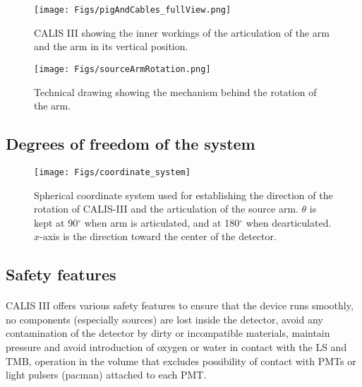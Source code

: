 \begin{figure}[htbp]
 \centering
  \texttt{[image: Figs/pigAndCables\_fullView.png]}
  \caption{CALIS III showing the inner workings of the articulation of the arm and the arm in its vertical position. }
  \label{fig:pigAndCables_fullView}
\end{figure}

\begin{figure}[htbp]
 \centering
  \texttt{[image: Figs/sourceArmRotation.png]}
  \caption{Technical drawing showing the mechanism behind the rotation of the arm. }
  \label{fig:sourceArmRotation}
\end{figure} 


\subsection{Degrees of freedom of the system}
\begin{figure}[htbp]
 \centering
  \texttt{[image: Figs/coordinate\_system]}
  \caption{Spherical coordinate system used for establishing the direction of the rotation of CALIS-III and the articulation of the source arm. $\theta$ is kept at 90$^{\circ}$ when arm is articulated, and at 180$^{\circ}$ when dearticulated. $x$-axis is the direction toward the center of the detector. }
  \label{fig:coordinate_system}
\end{figure} 
	
 \subsection{Safety features} \label{Safety Features}
  \paragraph{} 
 CALIS III offers various safety features to ensure that the device runs smoothly, no components (especially sources) are lost inside the detector, avoid any contamination of the detector by dirty or incompatible materials, maintain pressure and avoid introduction of oxygen or water in contact with the LS and TMB, operation in the volume that excludes possibility of contact with PMTs or light pulsers (pacman) attached to each PMT.
 

